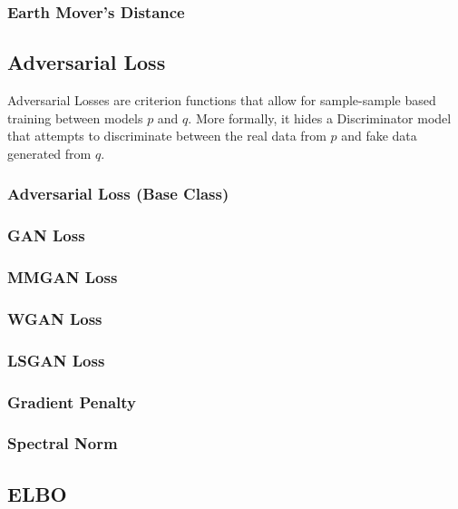 \subsubsection{Earth Mover's Distance}

\subsection{Adversarial Loss}
Adversarial Losses are criterion functions that allow for sample-sample based
training between models $p$ and $q$. More formally, it hides a Discriminator
model that attempts to discriminate between the real data from $p$ and fake data
generated from $q$.
\subsubsection{Adversarial Loss (Base Class)}
\subsubsection{GAN Loss}
\subsubsection{MMGAN Loss}
\subsubsection{WGAN Loss}
\subsubsection{LSGAN Loss}
\subsubsection{Gradient Penalty}
\subsubsection{Spectral Norm}

\subsection{ELBO}
